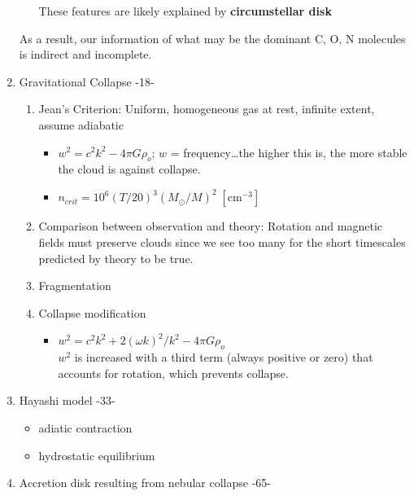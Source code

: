 \documentclass[12pt]{article}
\begin{document}
\begin{enumerate}
\begin{enumerate}
\begin{itemize}
                \end{itemize}
                These features are likely explained by \textbf{circumstellar disk}
        \end{enumerate}
        As a result, our information of what may be the dominant C, O, N
        molecules is indirect and incomplete.
    \item Gravitational Collapse -18-
        \begin{enumerate}
            \item Jean's Criterion: Uniform, homogeneous gas at rest,
                infinite extent, assume adiabatic
                \begin{itemize}
                    \item $w^2 = c^2k^2 - 4\pi G\rho_o$;
                        $w$ = frequency\ldots the higher this is, the more stable the
                        cloud is against collapse.
                    \item $n_{crit} = 10^{6}(T/20)^{3}(M_{\odot}/M)^{2}\;[\mathrm{cm}^{-3}]$
                \end{itemize}
            \item Comparison between observation and theory:
                Rotation and magnetic fields must preserve clouds since we see
                too many for the short timescales predicted by theory to be
                true.
            \item Fragmentation
            \item Collapse modification
                \begin{itemize}
                    \item $w^2 = c^2k^2 + 2({\omega}k)^2/k^2  - 4\pi G\rho_o$
                    \\
                    $w^2$ is increased with a third term (always positive or
                    zero) that accounts for
                    rotation, which prevents collapse.
                \end{itemize}
        \end{enumerate}
    \item Hayashi model -33-
        \begin{itemize}
            \item adiatic contraction
            \item hydrostatic equilibrium
        \end{itemize}
    \item Accretion disk resulting from nebular collapse -65-
        \begin{itemize}

\end{itemize}
\end{enumerate}
\end{document}

